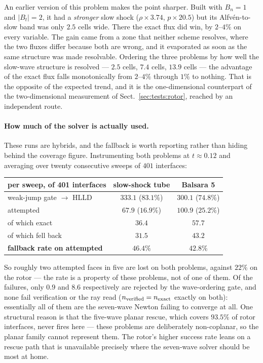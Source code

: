 An earlier version of this problem makes the point sharper. Built with
$B_n = 1$ and $|B_t| = 2$, it had a \emph{stronger} slow shock
($\rho \times 3.74$, $p \times 20.5$) but its Alfv\'en-to-slow band was only
$2.5$ cells wide. There the exact flux did win, by $2$--$4\%$ on every
variable. The gain came from a zone that neither scheme resolves, where the
two fluxes differ because both are wrong, and it evaporated as soon as the
same structure was made resolvable. Ordering the three problems by how well
the slow-wave structure is resolved --- $2.5$ cells, $7.4$ cells, $13.9$
cells --- the advantage of the exact flux falls monotonically from $2$--$4\%$
through $1\%$ to nothing. That is the opposite of the expected trend, and it
is the one-dimensional counterpart of the two-dimensional measurement of
Sect.~\ref{sec:tests:rotor}, reached by an independent route.

\paragraph{How much of the solver is actually used.} These runs are hybrids,
and the fallback is worth reporting rather than hiding behind the coverage
figure. Instrumenting both problems at $t \approx 0.12$ and averaging over
twenty consecutive sweeps of $401$ interfaces:

\begin{center}
\begin{tabular}{lcc}
\toprule
per sweep, of 401 interfaces & slow-shock tube & Balsara 5 \\
\midrule
weak-jump gate $\rightarrow$ HLLD & $333.1$ ($83.1\%$) & $300.1$ ($74.8\%$) \\
attempted                          & $67.9$ ($16.9\%$)  & $100.9$ ($25.2\%$) \\
\quad of which exact               & $36.4$             & $57.7$ \\
\quad of which fell back           & $31.5$             & $43.2$ \\
\midrule
\textbf{fallback rate on attempted} & $\mathbf{46.4\%}$ & $\mathbf{42.8\%}$ \\
\bottomrule
\end{tabular}
\end{center}

So roughly two attempted faces in five are lost on both problems, against
$22\%$ on the rotor --- the rate is a property of these problems, not of one
of them. Of the failures, only $0.9$ and $8.6$ respectively are rejected by
the wave-ordering gate, and none fail verification or the ray read
($n_{\rm verified} = n_{\rm exact}$ exactly on both): essentially all of them
are the seven-wave Newton failing to converge at all. One structural reason is that
the five-wave planar rescue, which covers $93.5\%$ of rotor interfaces,
never fires here --- these problems are deliberately non-coplanar, so the
planar family cannot represent them. The rotor's higher success rate leans
on a rescue path that is unavailable precisely where the seven-wave solver
should be most at home.

